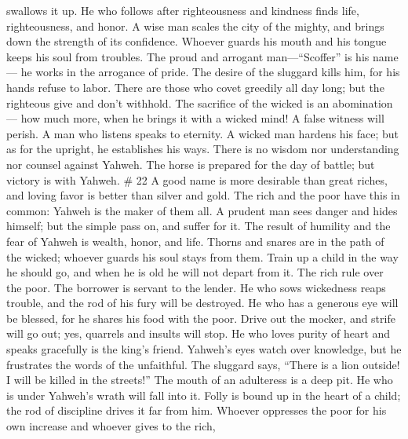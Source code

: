 swallows it up.  He who follows after righteousness and
kindness finds life, righteousness, and honor.  A wise man
scales the city of the mighty, and brings down the strength of its
confidence.  Whoever guards his mouth and his tongue keeps
his soul from troubles.  The proud and arrogant
man---``Scoffer'' is his name--- he works in the arrogance of pride.
 The desire of the sluggard kills him, for his hands refuse
to labor.  There are those who covet greedily all day long;
but the righteous give and don't withhold.  The sacrifice
of the wicked is an abomination--- how much more, when he brings it with
a wicked mind!  A false witness will perish. A man who
listens speaks to eternity.  A wicked man hardens his face;
but as for the upright, he establishes his ways.  There is
no wisdom nor understanding nor counsel against Yahweh. 
The horse is prepared for the day of battle; but victory is with Yahweh.
\# 22  A good name is more desirable than great riches, and
loving favor is better than silver and gold.  The rich and
the poor have this in common: Yahweh is the maker of them all.
 A prudent man sees danger and hides himself; but the simple
pass on, and suffer for it.  The result of humility and the
fear of Yahweh is wealth, honor, and life.  Thorns and
snares are in the path of the wicked; whoever guards his soul stays from
them.  Train up a child in the way he should go, and when he
is old he will not depart from it.  The rich rule over the
poor. The borrower is servant to the lender.  He who sows
wickedness reaps trouble, and the rod of his fury will be destroyed.
 He who has a generous eye will be blessed, for he shares
his food with the poor.  Drive out the mocker, and strife
will go out; yes, quarrels and insults will stop.  He who
loves purity of heart and speaks gracefully is the king's friend.
 Yahweh's eyes watch over knowledge, but he frustrates the
words of the unfaithful.  The sluggard says, ``There is a
lion outside! I will be killed in the streets!''  The mouth
of an adulteress is a deep pit. He who is under Yahweh's wrath will fall
into it.  Folly is bound up in the heart of a child; the
rod of discipline drives it far from him.  Whoever
oppresses the poor for his own increase and whoever gives to the rich,
